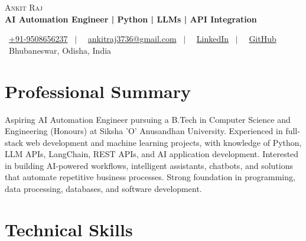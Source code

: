 \documentclass[letterpaper,10pt]{article}
\begin{document}
\begin{center}
    {\Huge \scshape Ankit Raj} \\ \vspace{3pt}
    \textbf{\large AI Automation Engineer | Python | LLMs | API Integration}
    \\ \vspace{4pt}

    \small
    \faPhone\ \href{tel:+919508656237}{+91-9508656237}
    \ $|$ \
    \faEnvelope\ \href{mailto:ankitraj3736@gmail.com}
    {ankitraj3736@gmail.com}
    \ $|$ \
    \faLinkedin\ \href{https://www.linkedin.com/in/ankit-raj-319201307/}
    {LinkedIn}
    \ $|$ \
    \faGithub\ \href{https://github.com/ankitraj36}
    {GitHub}
    \\[3pt]
    \faMapMarker*\ Bhubaneswar, Odisha, India
\end{center}

\section{Professional Summary}

\small{
Aspiring AI Automation Engineer pursuing a B.Tech in
Computer Science and Engineering (Honours) at Siksha 'O'
Anusandhan University. Experienced in full-stack web
development and machine learning projects, with knowledge
of Python, LLM APIs, LangChain, REST APIs, and AI application
development. Interested in building AI-powered workflows,
intelligent assistants, chatbots, and solutions that automate
repetitive business processes. Strong foundation in
programming, data processing, databases, and software
development.
}

\section{Technical Skills}
\end{document}
